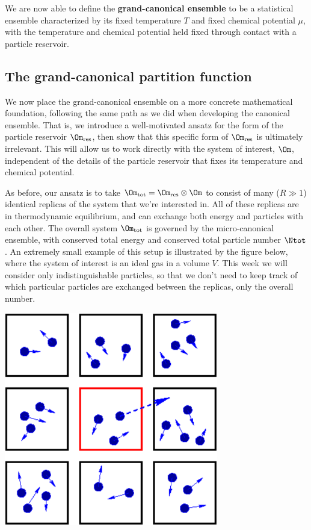\begin{shaded}
  We are now able to define the \textbf{grand-canonical ensemble} to be a statistical ensemble characterized by its fixed temperature $T$ and fixed chemical potential $\mu$, with the temperature and chemical potential held fixed through contact with a particle reservoir.
\end{shaded}



\subsection{\label{sec:Zg}The grand-canonical partition function}
We now place the grand-canonical ensemble on a more concrete mathematical foundation, following the same path as we did when developing the canonical ensemble.
That is, we introduce a well-motivated ansatz for the form of the particle reservoir $\Om_{\text{res}}$, then show that this specific form of $\Om_{\text{res}}$ is ultimately irrelevant.
This will allow us to work directly with the system of interest, $\Om$, independent of the details of the particle reservoir that fixes its temperature and chemical potential.

As before, our ansatz is to take $\Om_{\text{tot}} = \Om_{\text{res}} \otimes \Om$ to consist of many ($R \gg 1$) identical replicas of the system \Om that we're interested in.
All of these replicas are in thermodynamic equilibrium, and can exchange both energy and particles with each other.
The overall system $\Om_{\text{tot}}$ is governed by the micro-canonical ensemble, with conserved total energy \Etot and conserved total particle number $\Ntot$.
An extremely small example of this setup is illustrated by the figure below, where the system of interest is an ideal gas in a volume $V$.
This week we will consider only indistinguishable particles, so that we don't need to keep track of which particular particles are exchanged between the replicas, only the overall number.

\begin{center}
  \includegraphics[width=0.7\textwidth]{figs/unit06_reservoir.pdf}
\end{center}

